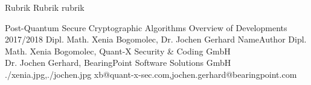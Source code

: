 \documentclass[a4paper,11pt]{article}
\begin{document}
\setcounter{footnote}{0}
\setcounter{figure}{0}


\Abschnitt
{Rubrik}
{Rubrik}
{rubrik}

\vspace{3mm}


\Aufsatz
{Post-Quantum Secure Cryptographic Algorithms}
{Overview of Developments 2017/2018}
{Dipl. Math. Xenia Bogomolec, Dr. Jochen Gerhard}
{NameAuthor}
{Dipl. Math. Xenia Bogomolec, Quant-X Security \& Coding GmbH\\ Dr. Jochen Gerhard, BearingPoint Software Solutions GmbH}
{./xenia.jpg,./jochen.jpg}
{xb@quant-x-sec.com,jochen.gerhard@bearingpoint.com}
\end{document}
